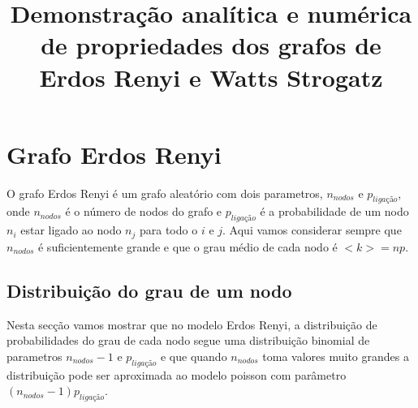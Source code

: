 \documentclass[conference, twocolumn]{IEEEtran}
\theoremstyle{plain}
\theoremstyle{definition}
\theoremstyle{remark}
\begin{document}
\title{Demonstração analítica e numérica de propriedades dos grafos de Erdos Renyi e Watts Strogatz}

\author{
\and
{}
}


\section{Grafo Erdos Renyi}
O grafo Erdos Renyi é um grafo aleatório com dois parametros, $n_{nodos}$ e $p_{ligação}$, onde $n_{nodos}$ é o número de nodos do grafo e $p_{ligação}$ é a probabilidade de um nodo $n_i$ estar ligado ao nodo $n_j$ para todo o $i$ e $j$. Aqui vamos considerar sempre que $n_{nodos}$ é suficientemente grande e que o grau médio de cada nodo é $<k>=np$.\cite{1}

\subsection{Distribuição do grau de um nodo}
Nesta secção vamos mostrar que no modelo Erdos Renyi, a distribuição de probabilidades do grau de cada nodo segue uma distribuição binomial de parametros $n_{nodos}-1$ e $p_{ligação}$ e que quando $n_{nodos}$ toma valores muito grandes a distribuição pode ser aproximada ao modelo poisson com parâmetro $(n_{nodos}-1) p_{ligação}$.
\end{document}
